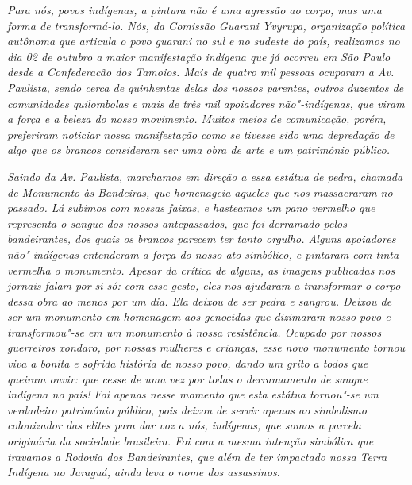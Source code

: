 
\noindent
\emph{Para nós, povos indígenas, a pintura não é uma agressão ao corpo, mas
uma forma de transformá-lo. Nós, da Comissão Guarani Yvyrupa,
organização política autônoma que articula o povo guarani no sul
e no sudeste do país, realizamos no dia 02 de outubro
a maior manifestação indígena que já ocorreu em São Paulo
desde a Confederacão dos Tamoios. Mais de quatro mil pessoas ocuparam a
Av. Paulista, sendo cerca de quinhentas delas dos nossos parentes,
outros duzentos de comunidades quilombolas e mais de três mil
apoiadores não"-indígenas, que viram a força e a beleza do nosso
movimento. Muitos meios de comunicação, porém, preferiram noticiar
nossa manifestação como se tivesse sido uma depredação de algo que os
brancos consideram ser uma obra de arte e um patrimônio público.} 

\emph{Saindo da Av. Paulista, marchamos em direção a essa estátua de pedra,
chamada de Monumento às Bandeiras, que homenageia aqueles que nos
massacraram no passado. Lá subimos com nossas faixas, e hasteamos um
pano vermelho que representa o sangue dos nossos antepassados, que foi
derramado pelos bandeirantes, dos quais os brancos parecem ter tanto
orgulho. Alguns apoiadores não"-indígenas entenderam a força do nosso
ato simbólico, e pintaram com tinta vermelha o monumento. Apesar da
crítica de alguns, as imagens publicadas nos jornais falam por si só:
com esse gesto, eles nos ajudaram a transformar o corpo dessa obra ao
menos por um dia. Ela deixou de ser pedra e sangrou. Deixou de ser um
monumento em homenagem aos genocidas que dizimaram nosso povo e
transformou"-se em um monumento à nossa resistência. Ocupado por nossos
guerreiros \emph{xondaro}, por nossas mulheres e crianças, esse novo
monumento tornou viva a bonita e sofrida história de nosso povo, dando
um grito a todos que queiram ouvir: que cesse de uma vez por todas o
derramamento de sangue indígena no país! Foi apenas nesse momento que
esta estátua tornou"-se um verdadeiro patrimônio público, pois deixou de
servir apenas ao simbolismo colonizador das elites para dar voz a nós,
indígenas, que somos a parcela originária da sociedade brasileira. Foi
com a mesma intenção simbólica que travamos a Rodovia
dos Bandeirantes, que além de ter impactado nossa Terra Indígena no
Jaraguá, ainda leva o nome dos assassinos.}

